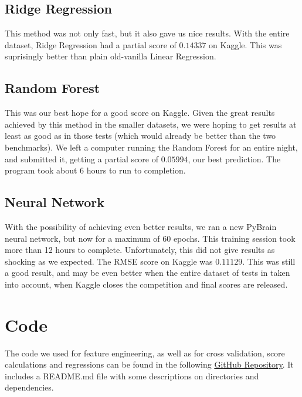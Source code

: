 \documentclass[10pt]{article}
\begin{document}
\medskip

\subsection{Ridge Regression}

This method was not only fast, but it also gave us nice results. With the
entire dataset, Ridge Regression had a partial score of $0.14337$ on Kaggle.
This was suprisingly better than plain old-vanilla Linear Regression.

\subsection{Random Forest}

This was our best hope for a good score on Kaggle. Given the great results
achieved by this method in the smaller datasets, we were hoping to get results
at least as good as in those tests (which would already be better than the two
benchmarks). We left a computer running the Random Forest for an entire night,
and submitted it, getting a partial score of $0.05994$, our best prediction.
The program took about 6 hours to run to completion.

\subsection{Neural Network}

With the possibility of achieving even better results, we ran a new PyBrain
neural network, but now for a maximum of 60 epochs. This training session
took more than 12 hours to complete. Unfortunately, this did not give results
as shocking as we expected. The RMSE score on Kaggle was $0.11129$. This
was still a good result, and may be even better when the entire dataset of
tests in taken into account, when Kaggle closes the competition and final
scores are released.

\section{Code}

The code we used for feature engineering, as well as for cross validation,
score calculations and regressions can be found in the following 
\href{https://github.com/victordomene/cs181-practicals/}{GitHub Repository}.
It includes a README.md file with some descriptions on directories and
dependencies.
\end{document}
